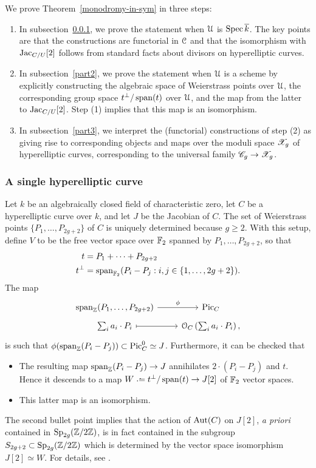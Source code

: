 We prove Theorem~\ref{monodromy-in-sym} in three steps:
\begin{enumerate}[(1)]
	\item In subsection~\ref{sec:single}, we prove the statement when $\mathcal{U}$ is $\operatorname{Spec} \overline{k}$. The key points are that the constructions are functorial in $\mathcal{C}$ and that the isomorphism with $\operatorname{Jac}_{C/U}[2]$ follows from standard facts about divisors on hyperelliptic curves.
	\item In subsection~\ref{part2}, we prove the statement when $\mathcal{U}$ is a scheme by explicitly constructing the algebraic space of Weierstrass points over $\mathcal{U}$, the corresponding group space $t^\perp / \operatorname{span}(t)$ over $\mathcal{U}$, and the map from the latter to $\operatorname{Jac}_{C/U}[2]$. Step (1) implies that this map is an isomorphism.
	\item In subsection~\ref{part3}, we interpret the (functorial) constructions of step (2) as giving rise to corresponding objects and maps over the moduli space $\mathscr{X}_g$ of hyperelliptic curves, corresponding to the universal family $\mathscr{C}_g \to \mathscr{X}_g$.
\end{enumerate}



\subsubsection{A single hyperelliptic curve} \label{sec:single}
Let $k$ be an algebraically closed field of characteristic zero, let $C$ be a hyperelliptic curve over $k$, and let $J$ be the Jacobian of $C$. The
set of Weierstrass points $\{P_1, \ldots, P_{2g+2}\}$ of $C$ is uniquely determined because $g \ge 2$. With this setup, define $V$
to be the free vector space over $\mathbb F_2$ spanned by $P_1, \ldots, P_{2g+2}$, so that
\begin{align*}
	t &= P_1 + \cdots + P_{2g+2} \\
	t^\perp &= \operatorname{span}_{\mathbb{F}_2}(P_i - P_j : i, j \in \{1, \ldots, 2g+2\}).
\end{align*}
The map
\[
\begin{tikzcd}[row sep = 0.15cm]
\on{span}_{\bz}(P_1, \ldots, P_{2g+2}) \ar{r}{\phi} & \on{Pic}_C \\
\sum_i a_i \cdot P_i  \ar[mapsto]{r} & \mc{O}_C\left( \sum_i a_i \cdot P_i \right),
\end{tikzcd}
\]
is such that $\phi(\operatorname{span}_{{\mathbb Z}}(P_i - P_j)) \subset \operatorname{Pic}_C^0 \simeq J$. Furthermore, it can be checked that
\begin{itemize}
	\item The resulting map $\operatorname{span}_{{\mathbb Z}}(P_i - P_j) \to J$ annihilates $2\cdot (P_i - P_j)$ and $t$. Hence it descends to a map $W \defeq t^\perp / \on{span}(t) \to J[2]$ of $\mathbb F_2$ vector spaces.
	\item This latter map is an isomorphism.
\end{itemize}
The second bullet point implies that the action of $\operatorname{Aut}(C)$ on $J[2]$, \emph{a priori} contained in $\operatorname{Sp}_{2g}({\mathbb Z} / 2 {\mathbb Z})$, is in fact contained in the subgroup $S_{2g+2} \subset \operatorname{Sp}_{2g}({\mathbb Z} / 2 {\mathbb Z})$ which is determined by the vector space isomorphism $J[2] \simeq W$. For details, see \cite[Proposition 1.2.1(a)]{yelton2015thesis}.


